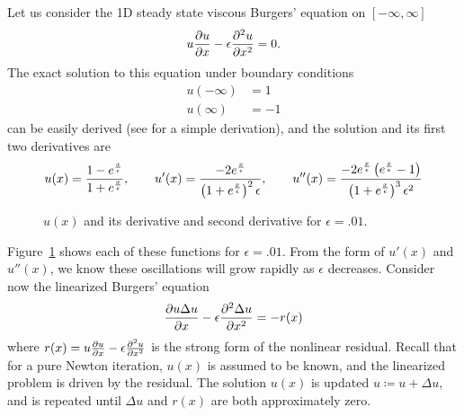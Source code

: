Let us consider the 1D steady state viscous Burgers' equation on $[-\infty,\infty]$
\[
u\pd{u}{x} - \epsilon \pdd{u}{x} = 0.
\]
The exact solution to this equation under boundary conditions
\begin{align*}
u(-\infty) &= 1\\
u(\infty) &= -1
\end{align*}
can be easily derived (see \cite{Barter} for a simple derivation), and the solution and its first two derivatives are
\[
u(x) = \frac{1-e^{\frac{x}{\epsilon}}}{1+e^\frac{x}{\epsilon}}, \qquad u'(x) = \frac{-2e^{\frac{x}{\epsilon}}}{\LRp{1+e^{\frac{x}{\epsilon}}}^2\epsilon}, \qquad u''(x) = \frac{-2e^{\frac{x}{\epsilon}}\LRp{e^{\frac{x}{\epsilon}}-1}}{\LRp{1+e^{\frac{x}{\epsilon}}}^3\epsilon^2}
\]
\begin{figure}
\centering
{}
\caption{$u(x)$ and its derivative and second derivative for $\epsilon = .01$.}
\label{fig:burgersSoln100}
\end{figure} 
Figure~\ref{fig:burgersSoln100} shows each of these functions for $\epsilon = .01$.  From the form of $u'(x)$ and $u''(x)$, we know these oscillations will grow rapidly as $\epsilon$ decreases.  Consider now the linearized Burgers' equation
\[
\pd{u\Delta u}{x} - \epsilon \pdd{\Delta u}{x} = - r(x)
\]
where $r(x) = u\pd{u}{x} - \epsilon \pdd{u}{x}$ is the strong form of the nonlinear residual.  Recall that for a pure Newton iteration, $u(x)$ is assumed to be known, and the linearized problem is driven by the residual.  The solution $u(x)$ is updated $u \coloneqq u + \Delta u$, and is repeated until $\Delta u$ and $r(x)$ are both approximately zero.


